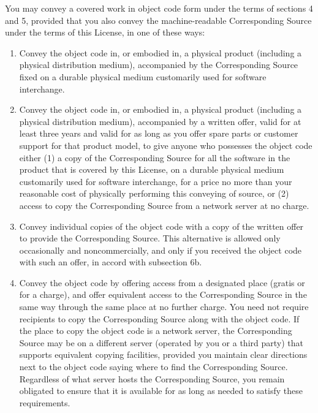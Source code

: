 \begin{enumerate}
	You may convey a covered work in object code form under the terms
	of sections 4 and 5, provided that you also convey the
	machine-readable Corresponding Source under the terms of this License,
	in one of these ways:
	\begin{enumerate}
		\item Convey the object code in, or embodied in, a physical product
		(including a physical distribution medium), accompanied by the
		Corresponding Source fixed on a durable physical medium
		customarily used for software interchange.
		
		\item Convey the object code in, or embodied in, a physical product
		(including a physical distribution medium), accompanied by a
		written offer, valid for at least three years and valid for as
		long as you offer spare parts or customer support for that product
		model, to give anyone who possesses the object code either (1) a
		copy of the Corresponding Source for all the software in the
		product that is covered by this License, on a durable physical
		medium customarily used for software interchange, for a price no
		more than your reasonable cost of physically performing this
		conveying of source, or (2) access to copy the
		Corresponding Source from a network server at no charge.
		
		\item Convey individual copies of the object code with a copy of the
		written offer to provide the Corresponding Source.  This
		alternative is allowed only occasionally and noncommercially, and
		only if you received the object code with such an offer, in accord
		with subsection 6b.
		
		\item Convey the object code by offering access from a designated
		place (gratis or for a charge), and offer equivalent access to the
		Corresponding Source in the same way through the same place at no
		further charge.  You need not require recipients to copy the
		Corresponding Source along with the object code.  If the place to
		copy the object code is a network server, the Corresponding Source
		may be on a different server (operated by you or a third party)
		that supports equivalent copying facilities, provided you maintain
		clear directions next to the object code saying where to find the
		Corresponding Source.  Regardless of what server hosts the
		Corresponding Source, you remain obligated to ensure that it is
		available for as long as needed to satisfy these requirements.
		

\end{enumerate}
\end{enumerate}
